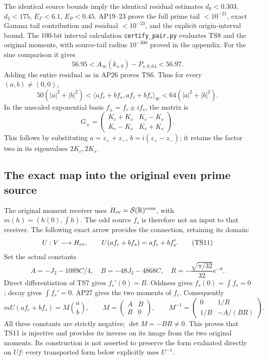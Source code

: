 The identical source bounds imply the identical residual estimates
\(d_0<0.303\), \(d_2<175\), \(E_\Gamma<6.1\), \(E_P<0.45\).
AP19--23 prove the full prime tail \(<10^{-21}\), exact Gamma
tail contribution and residual \(<10^{-23}\), and the explicit
origin-interval bound. The 100-bit interval calculation
\texttt{certify\_pair.py} evaluates TS8 and the original moments,
with source-tail radius \(10^{-300}\) proved in the appendix.
For the sine comparison it gives
\[
 56.95<A_\infty(k_{s,0})-P_{s,0,64}<56.97.
\]
Adding the entire residual as in AP26 proves TS6. Thus for every
\((a,b)\ne(0,0)\),
\[
 50(|a|^2+|b|^2)
 <\langle af_c+bf_s,af_c+bf_s\rangle_W
 <64(|a|^2+|b|^2).\tag{TS9}
\]
In the unscaled exponential basis \(f_\pm=f_c\pm if_s\), the matrix is
\[
 G_\pm=\begin{pmatrix}K_c+K_s&K_c-K_s\\K_c-K_s&K_c+K_s\end{pmatrix}.
 \tag{TS10}
\]
This follows by substituting \(a=z_++z_-\),
\(b=i(z_+-z_-)\); it retains the factor two in its eigenvalues
\(2K_c,2K_s\).

\subsection{The exact map into the original even prime source}
The original moment receiver uses \(H_{\rm ev}=\mathcal S(\mathbb R)^{\rm even}\),
with \(m(h)=(h(0),\int h)\). The odd source \(f_s\) is therefore
not an input to that receiver. The following exact arrow provides
the connection, retaining its domain:
\[
 U:V\longrightarrow H_{\rm ev},\qquad
 U(af_c+bf_s)=af_c+bf_s'.\tag{TS11}
\]
Set the actual constants
\[
 A=-J_2-1089C/4,\quad B=-48J_2-4868C,\quad
 R=-\frac{\sqrt{\pi/32}}{32}e^{-8}.
 \tag{TS12}
\]
Direct differentiation of TS7 gives \(f_s'(0)=B\).
Oddness gives \(f_s(0)=\int f_s=0\); decay gives
\(\int f_s'=0\). AP27 gives the two moments of \(f_c\).
Consequently
\[
 mU(af_c+bf_s)=M\binom ab,\qquad
 M=\begin{pmatrix}A&B\\R&0\end{pmatrix},\qquad
 M^{-1}=\begin{pmatrix}0&1/R\\1/B&-A/(BR)\end{pmatrix}.
 \tag{TS13}
\]
All three constants are strictly negative; \(\det M=-BR\ne0\).
This proves that TS11 is injective and provides its inverse on
its image from the two original moments. Its construction is not
asserted to preserve the form evaluated directly on \(Uf\): every
transported form below explicitly uses \(U^{-1}\).

